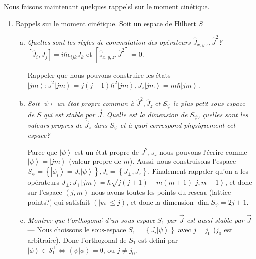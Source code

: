 \documentclass[10pt]{report}
\newcommand{\ket}[1]{\left|#1\right>}
\newcommand{\dotp}[2]{\left<#1\left.\right|#2\right>}
\newcommand{\abs}[1]{\left|#1\right|}
\begin{document}
Nous faisons maintenant quelques rappelsl sur le moment cin\'etique.
\begin{enumerate}[1)]
    \item Rappels sur le moment cin\'etique. Soit un espace de Hilbert $S$
        \begin{enumerate}[a)]
            \item \emph{Quelles sont les r\`egles de commutation des op\'erateurs $\hat{J}_{x,y,z}, \hat{J}^2$?} --- $\left[ \hat{J}_{i},\hat{J}_j \right] = i\hbar \epsilon_{ijk}J_k$ et $\left[ \hat{J}_{x,y,z},\hat{J}^2 \right] = 0$.

                Rappeler que nous pouvons construire les \'etats $\ket{jm}: J^2\ket{jm} = j(j+1)\hbar^2\ket{jm}, J_z\ket{jm} = m\hbar\ket{jm}$.
            \item \emph{Soit $\ket{\psi}$ un \'etat propre commun \`a $\hat{J}^2, \hat{J}_z$ et $S_\psi$ le plus petit sous-espace de $S$ qui est stable par $\vec{J}$. Quelle est la dimension de $S_\psi$, quelles sont les valeurs propres de $\hat{J}_z$ dans $S_\psi$ et \`a quoi correspond physiquement cet espace?}

                Parce que $\ket{\psi}$ est un \'etat propre de $J^2, J_z$ nous pouvons l'\'ecrire comme $\ket{\psi} = \ket{jm}$ (valeur propre de $m$). Aussi, nous construisons l'espace $S_\psi = \left\{ \ket{\phi_i} = J_i \ket{\psi} \right\}, J_i = \left\{ J_{\pm},J_z \right\}$. Finalement rappeler qu'on a les op\'erateurs $J_{\pm}: J_+\ket{jm} = \hbar\sqrt{j(j+1) - m(m\pm 1)}\ket{j, m+1}$, et donc sur l'espace $(j,m)$ nous avons toutes les points du reseau (lattice points?) qui satisfait $(\abs{m} \leq j)$, et donc la dimension $\dim S_\psi = 2j + 1$. 

            \item \emph{Montrer que l'orthogonal d'un sous-espace $S_1$ par $\vec{J}$ est aussi stable par $\vec{J}$} --- Nous choissons le sous-espace $S_1 = \left\{ J_i\ket{\psi} \right\}$ avec $j = j_0$ ($j_0$ est arbitraire). Donc l'orthogonal de $S_1$ est defini par $\ket{\phi} \in S_1^{\perp} \Leftrightarrow \dotp{\psi}{\phi} = 0$, ou $j \neq j_0$.


\end{enumerate}
\end{enumerate}
\end{document}
